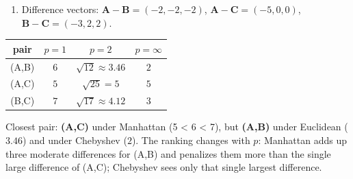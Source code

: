\documentclass[
  11pt,
]{article}
\providecommand{\tightlist}{%
  \setlength{\itemsep}{0pt}\setlength{\parskip}{0pt}}
\begin{document}
\begin{solutionbox}

\begin{enumerate}
\def\labelenumi{(\alph{enumi})}
\tightlist
\item
  Difference vectors: \(\mathbf{A}-\mathbf{B} = (-2,-2,-2)\),
  \(\mathbf{A}-\mathbf{C} = (-5,0,0)\),
  \(\mathbf{B}-\mathbf{C} = (-3,2,2)\).
\end{enumerate}

\begin{longtable}[]{@{}cccc@{}}
\toprule\noalign{}
pair & \(p=1\) & \(p=2\) & \(p=\infty\) \\
\midrule\noalign{}
\endhead
\bottomrule\noalign{}
\endlastfoot
(A,B) & \(6\) & \(\sqrt{12}\approx3.46\) & \(2\) \\
(A,C) & \(5\) & \(\sqrt{25}=5\) & \(5\) \\
(B,C) & \(7\) & \(\sqrt{17}\approx4.12\) & \(3\) \\
\end{longtable}

Closest pair: \textbf{(A,C)} under Manhattan (5 \textless{} 6
\textless{} 7), but \textbf{(A,B)} under Euclidean (\(3.46\)) and under
Chebyshev (\(2\)). The ranking changes with \(p\): Manhattan adds up
three moderate differences for (A,B) and penalizes them more than the
single large difference of (A,C); Chebyshev sees only that single
largest difference.


\end{solutionbox}
\end{document}
